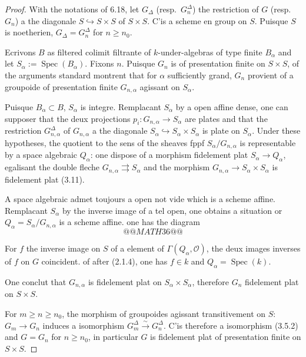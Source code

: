 \documentclass[12pt,a4paper]{article}
\theoremstyle{plain}
\theoremstyle{definition}
\DeclareMathOperator{\Spec}{Spec}
\begin{document}
\begin{proof}
With the notations of 6.18, let $G_\Delta$ (resp.~$G_n^\Delta$) the restriction of $G$ (resp.~$G_n$) a the diagonale $S \hookrightarrow S \times S$ of $S \times S$. C'is a scheme en group on $S$. Puisque $S$ is noetherien, $G_\Delta = G_n^\Delta$ for $n \geq n_0$.

Ecrivons $B$ as filtered colimit filtrante of $k$-under-algebras of type finite $B_\alpha$ and let $S_\alpha := \Spec(B_\alpha)$. Fixons $n$. Puisque $G_n$ is of presentation finite on $S \times S$, of the arguments standard montrent that for $\alpha$ sufficiently grand, $G_n$ provient of a groupoide of presentation finite $G_{n,\alpha}$ agissant on $S_\alpha$.

Puisque $B_\alpha \subset B$, $S_\alpha$ is integre. Remplacant $S_\alpha$ by a open affine dense, one can supposer that the deux projections $p_i : G_{n,\alpha} \to S_\alpha$ are plates and that the restriction $G_{n,\alpha}^\Delta$ of $G_{n,\alpha}$ a the diagonale $S_\alpha \hookrightarrow S_\alpha \times S_\alpha$ is plate on $S_\alpha$. Under these hypotheses, the quotient to the sens of the sheaves fppf $S_\alpha/G_{n,\alpha}$ is representable by a space algebraic $Q_\alpha$: one dispose of a morphism fidelement plat $S_\alpha \to Q_\alpha$, egalisant the double fleche $G_{n,\alpha} \rightrightarrows S_\alpha$ and the morphism $G_{n,\alpha} \to S_\alpha \times S_\alpha$ is fidelement plat (3.11).

A space algebraic admet toujours a open not vide which is a scheme affine. Remplacant $S_\alpha$ by the inverse image of a tel open, one obtains a situation or $Q_\alpha = S_\alpha/G_{n,\alpha}$ is a scheme affine. one has the diagram
\[
@@MATH36@@
\]

For $f$ the inverse image on $S$ of a element of $\Gamma(Q_\alpha, \mathcal{O})$, the deux images inverses of $f$ on $G$ coincident. of after (2.1.4), one has $f \in k$ and $Q_\alpha = \Spec(k)$.

One conclut that $G_{n,\alpha}$ is fidelement plat on $S_\alpha \times S_\alpha$, therefore $G_n$ fidelement plat on $S \times S$.

For $m \geq n \geq n_0$, the morphism of groupoides agissant transitivement on $S$: $G_m \to G_n$ induces a isomorphism $G_m^\Delta \xrightarrow{\sim} G_n^\Delta$. C'is therefore a isomorphism (3.5.2) and $G = G_n$ for $n \geq n_0$, in particular $G$ is fidelement plat of presentation finite on $S \times S$.
\end{proof}
\end{document}
